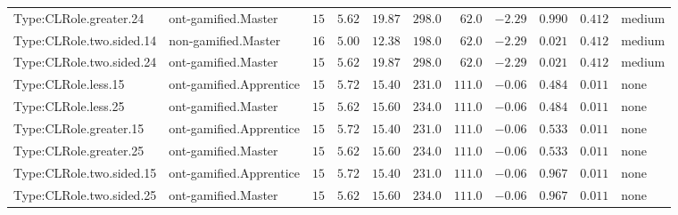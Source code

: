 \documentclass[6pt,a4paper]{article}
\begin{document}
{\begin{longtable}{llrrrrrrrrl}
Type:CLRole.greater.24&ont-gamified.Master&$15$&$5.62$&$19.87$&$ 298.0$&$ 62.0$&$-2.29$&$0.990$&$0.412$&medium\tabularnewline
Type:CLRole.two.sided.14&non-gamified.Master&$16$&$5.00$&$12.38$&$ 198.0$&$ 62.0$&$-2.29$&$0.021$&$0.412$&medium\tabularnewline
Type:CLRole.two.sided.24&ont-gamified.Master&$15$&$5.62$&$19.87$&$ 298.0$&$ 62.0$&$-2.29$&$0.021$&$0.412$&medium\tabularnewline
Type:CLRole.less.15&ont-gamified.Apprentice&$15$&$5.72$&$15.40$&$ 231.0$&$111.0$&$-0.06$&$0.484$&$0.011$&none\tabularnewline
Type:CLRole.less.25&ont-gamified.Master&$15$&$5.62$&$15.60$&$ 234.0$&$111.0$&$-0.06$&$0.484$&$0.011$&none\tabularnewline
Type:CLRole.greater.15&ont-gamified.Apprentice&$15$&$5.72$&$15.40$&$ 231.0$&$111.0$&$-0.06$&$0.533$&$0.011$&none\tabularnewline
Type:CLRole.greater.25&ont-gamified.Master&$15$&$5.62$&$15.60$&$ 234.0$&$111.0$&$-0.06$&$0.533$&$0.011$&none\tabularnewline
\newpage
Type:CLRole.two.sided.15&ont-gamified.Apprentice&$15$&$5.72$&$15.40$&$ 231.0$&$111.0$&$-0.06$&$0.967$&$0.011$&none\tabularnewline
Type:CLRole.two.sided.25&ont-gamified.Master&$15$&$5.62$&$15.60$&$ 234.0$&$111.0$&$-0.06$&$0.967$&$0.011$&none\tabularnewline
\hline
\end{longtable}}
\end{document}
